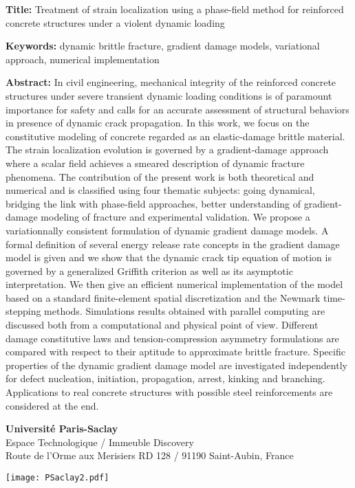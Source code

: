 \begin{flushleft}
\vspace{20pt}

\begin{mdframed}
\textbf{Title:} Treatment of strain localization using a phase-field method for reinforced concrete structures under a violent dynamic loading

\textbf{Keywords:} dynamic brittle fracture, gradient damage models, variational approach, numerical implementation

\textbf{Abstract:} In civil engineering, mechanical integrity of the reinforced concrete structures under severe transient dynamic loading conditions is of paramount importance for safety and calls for an accurate assessment of structural behaviors in presence of dynamic crack propagation. In this work, we focus on the constitutive modeling of concrete regarded as an elastic-damage brittle material. The strain localization evolution is governed by a gradient-damage approach where a scalar field achieves a smeared description of dynamic fracture phenomena. The contribution of the present work is both theoretical and numerical and is classified using four thematic subjects: going dynamical, bridging the link with phase-field approaches, better understanding of gradient-damage modeling of fracture and experimental validation. We propose a variationnally consistent formulation of dynamic gradient damage models. A formal definition of several energy release rate concepts in the gradient damage model is given and we show that the dynamic crack tip equation of motion is governed by a generalized Griffith criterion as well as its asymptotic interpretation. We then give an efficient numerical implementation of the model based on a standard finite-element spatial discretization and the Newmark time-stepping methods. Simulations results obtained with parallel computing are discussed both from a computational and physical point of view. Different damage constitutive laws and tension-compression asymmetry formulations are compared with respect to their aptitude to approximate brittle fracture. Specific properties of the dynamic gradient damage model are investigated independently for defect nucleation, initiation, propagation, arrest, kinking and branching. Applications to real concrete structures with possible steel reinforcements are considered at the end.
\end{mdframed}
\end{flushleft}

\vfill

\begin{minipage}[b]{0.6\textwidth}
\small
\color{color02}
\textbf{Université Paris-Saclay} \\
Espace Technologique / Immeuble Discovery  \\
Route de l'Orme aux Merisiers RD 128 / 91190 Saint-Aubin, France
\end{minipage}
\hfill
\begin{minipage}[b]{0.35\textwidth}
\hfill
\texttt{[image: PSaclay2.pdf]}
\end{minipage}